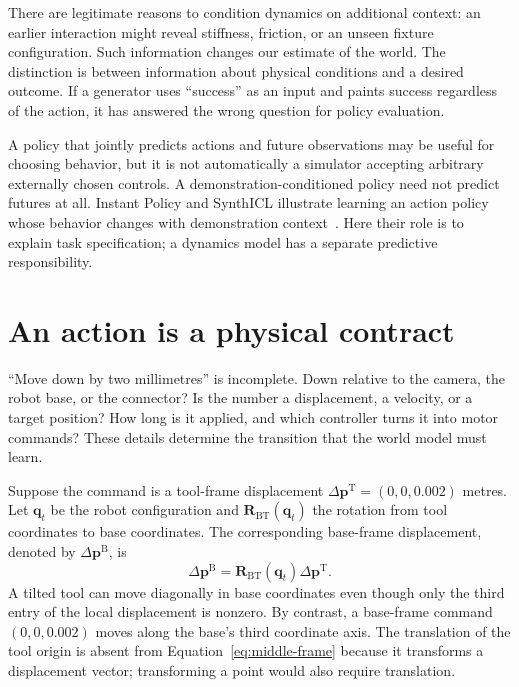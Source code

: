 There are legitimate reasons to condition dynamics on additional context: an earlier interaction might reveal stiffness, friction, or an unseen fixture configuration. Such information changes our estimate of the world. The distinction is between information about physical conditions and a desired outcome. If a generator uses ``success'' as an input and paints success regardless of the action, it has answered the wrong question for policy evaluation.

A policy that jointly predicts actions and future observations may be useful for choosing behavior, but it is not automatically a simulator accepting arbitrary externally chosen controls. A demonstration-conditioned policy need not predict futures at all. Instant Policy and SynthICL illustrate learning an action policy whose behavior changes with demonstration context~\citep{instant,synthicl}. Here their role is to explain task specification; a dynamics model has a separate predictive responsibility.


\section{An action is a physical contract}
``Move down by two millimetres'' is incomplete. Down relative to the camera, the robot base, or the connector? Is the number a displacement, a velocity, or a target position? How long is it applied, and which controller turns it into motor commands? These details determine the transition that the world model must learn.

Suppose the command is a tool-frame displacement $\Delta\mathbf p^{\mathrm T}=(0,0,0.002)$ metres. Let $\mathbf q_t$ be the robot configuration and $\mathbf R_{\mathrm{BT}}(\mathbf q_t)$ the rotation from tool coordinates to base coordinates. The corresponding base-frame displacement, denoted by $\Delta\mathbf p^{\mathrm B}$, is
\begin{equation}
 \Delta\mathbf p^{\mathrm B}=\mathbf R_{\mathrm{BT}}(\mathbf q_t)\Delta\mathbf p^{\mathrm T}.
 \label{eq:middle-frame}
\end{equation}
A tilted tool can move diagonally in base coordinates even though only the third entry of the local displacement is nonzero. By contrast, a base-frame command $(0,0,0.002)$ moves along the base's third coordinate axis. The translation of the tool origin is absent from Equation~\eqref{eq:middle-frame} because it transforms a displacement vector; transforming a point would also require translation.


